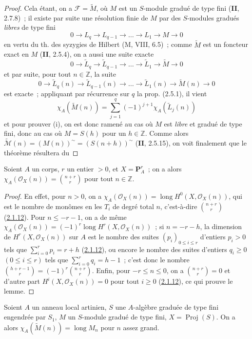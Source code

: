 \begin{proof}
Cela étant, on a $\mathcal F=\widetilde M$, où $M$ est un $S$-module
gradué de type fini (\textbf{II}, 2.7.8)~; il existe par suite une résolution finie
de $M$ par des $S$-modules gradués \emph{libres} de type fini
\[
0\to L_q\to L_{q-1}\to\ldots\to L_1\to M\to0
\]
en vertu du th. des syzygies de Hilbert (M, VIII, 6.5)~; comme
$\widetilde M$ est un foncteur exact en $M$ (\textbf{II}, 2.5.4), on a
aussi une suite exacte
\[
0\to\widetilde L_q\to\widetilde L_{q-1}\to\ldots
\to\widetilde L_1\to\widetilde M\to0
\]
et par suite, pour tout $n\in\mathbb Z$, la suite
\[
0\to\widetilde L_q(n)\to\widetilde L_{q-1}(n)\to\ldots
\to\widetilde L_1(n)\to\widetilde M(n)\to0
\]
est exacte~; appliquant par récurrence sur $q$ la prop. (2.5.1), il vient
\[
\chi_A(\widetilde M(n))=\sum_{j=1}^{q}(-1)^{j+1}
\chi_A(\widetilde L_j(n))
\]
et pour prouver (i), on est donc ramené au cas où $M$ est \emph{libre} et gradué
de type fini, donc au cas où $M=S(h)$ pour un $h\in\mathbb Z$. Comme
alors $\widetilde{\mathcal M}(n)=(M(n))^\sim=(S(n+h))^\sim$ (\textbf{II}, 2.5.15), on voit
finalement que le théorème résultera du
\end{proof}

\begin{lemma}[2.5.3.1]
\label{III.2.5.3.1-fr}
Soient $A$ un corps, $r$ un entier $>0$, et $X=\mathbf P_A^r$~; on a
alors
$\chi_A(\mathcal O_X(n))=\binom{n+r}{r}$
pour tout $n\in\mathbb Z$.
\end{lemma}

\begin{proof}
En effet, pour $n>0$, on a
$\chi_A(\mathcal O_X(n))=\operatorname{long}H^0(X,\mathcal O_X(n))$, qui
est le nombre de monômes en les $T_i$ de degré total $n$, c'est-à-dire
$\binom{n+r}{r}$ (\hyperref[III.2.1.12-fr]{2.1.12}). Pour
$n\leq-r-1$, on a de même
$\chi_A(\mathcal O_X(n))=(-1)^r
\operatorname{long}H^r(X,\mathcal O_X(n))$~;
si $n=-r-h$, la dimension de $H^r(X,\mathcal O_X(n))$ sur $A$ est le
nombre des suites $(p_i)_{0\leq i\leq r}$ d'entiers $p_i>0$ tels que
$\sum_{i=0}^{r}p_i=r+h$ (\hyperref[III.2.1.12-fr]{2.1.12}), ou encore le
nombre des suites d'entiers $q_i\geq0$ $(0\leq i\leq r)$ tels que
$\sum_{i=0}^{r}q_i=h-1$~; c'est donc le nombre
$\binom{h+r-1}{r}=(-1)^r\binom{n+r}{r}$.
Enfin, pour $-r\leq n\leq0$, on a $\binom{n+r}{r}=0$ et d'autre part
$H^i(X,\mathcal O_X(n))=0$ pour tout $i\geq0$
(\hyperref[III.2.1.12-fr]{2.1.12}), ce qui prouve le lemme.
\end{proof}

\begin{corollary}[2.5.4]
\label{III.2.5.4-fr}
Soient $A$ un anneau local artinien, $S$ une $A$-algèbre graduée de type
fini engendrée par $S_1$, $M$ un $S$-module gradué de type fini,
$X=\operatorname{Proj}(S)$. On a alors
$\chi_A(\widetilde M(n))=\operatorname{long}M_n$
pour $n$ assez grand.
\end{corollary}

